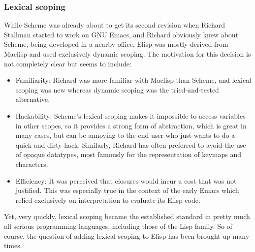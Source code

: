 \documentclass[format=acmsmall, review=false, screen=true]{acmart}
\newcommand \Elisp {Elisp}
\begin{document}


\subsubsection{Lexical scoping}

While Scheme was already about to get its second revision when Richard
Stallman started to work on GNU Emacs, and Richard obviously knew about
Scheme, being developed in a nearby office, \Elisp{} was mostly derived from
Maclisp and used exclusively dynamic scoping.  The motivation for this
decision is not completely clear but seems to include:
\begin{itemize}
\item Familiarity: Richard was more familiar with Maclisp than Scheme, and
  lexical scoping was new whereas dynamic scoping was the
  tried-and-tested alternative.
\item Hackability: Scheme's lexical scoping makes it impossible to access
  variables in other scopes, so it provides a strong form of abstraction,
  which is great in many cases, but can be annoying to the end user who just
  wants to do a quick and dirty hack.  Similarly, Richard has often
  preferred to avoid the use of opaque datatypes, most famously for the
  representation of keymaps and characters.
\item Efficiency: It was perceived that closures would incur a cost that was
  not justified.  This was especially true in the context of the early Emacs
  which relied exclusively on interpretation to evaluate its \Elisp{} code.
\end{itemize}
Yet, very quickly, lexical scoping became the established standard in pretty
much all serious programming languages, including those of the Lisp family.
So of course, the question of adding lexical scoping to \Elisp{} has been
brought up many times.
\end{document}
